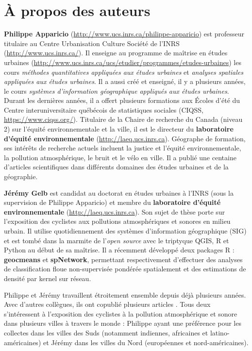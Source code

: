 \documentclass[
  11pt,
  french,
]{book}
\begin{document}
\hypertarget{auteurs}{%
\chapter*{À propos des auteurs}\label{auteurs}}

\textbf{Philippe Apparicio} (\url{http://www.ucs.inrs.ca/philippe-apparicio}) est professeur titulaire au Centre Urbanisation Culture Société de l'INRS (\url{http://www.ucs.inrs.ca/}). Il enseigne au programme de maîtrise en études urbaines (\url{http://www.ucs.inrs.ca/ucs/etudier/programmes/etudes-urbaines}) les cours \emph{méthodes quantitatives appliquées aux études urbaines} et \emph{analyses spatiales appliquées aux études urbaines}. Il a aussi créé et enseigné, il y a plusieurs années, le cours \emph{systèmes d'information géographique appliqués aux études urbaines}. Durant les dernières années, il a offert plusieurs formations aux Écoles d'été du Centre interuniversitaire québécois de statistiques sociales (CIQSS, \url{https://www.ciqss.org/}). Titulaire de la Chaire de recherche du Canada (niveau 2) sur l'équité environnementale et la ville, il est le directeur du \textbf{laboratoire d'équité environnementale} (\url{http://laeq.ucs.inrs.ca}). Géographe de formation, ses intérêts de recherche actuels incluent la justice et l'équité environnementale, la pollution atmosphérique, le bruit et le vélo en ville. Il a publié une centaine d'articles scientifiques dans différents domaines des études urbaines et de la géographie.

\textbf{Jérémy Gelb} est candidat au doctorat en études urbaines à l'INRS (sous la supervision de Philippe Apparicio) et membre du \textbf{laboratoire d'équité environnementale} (\url{http://laeq.ucs.inrs.ca}). Son sujet de thèse porte sur l'exposition des cyclistes aux pollutions atmosphériques et sonores en milieu urbain. Il utilise quotidiennement des systèmes d'information géographique (SIG) et est tombé dans la marmite de l'\emph{open source} avec le triptyque QGIS, R et Python au début de sa maîtrise. Il a récemment développé deux packages R : \textbf{geocmeans} et \textbf{spNetwork}, permettant respectivement d'effectuer des analyses de classification floue non-supervisée pondérée spatialement et des estimations de densité par kernel sur réseau.

Philippe et Jérémy travaillent étroitement ensemble depuis déjà plusieurs années. Avec d'autres collègues, ils ont copublié plusieurs articles \citetext{\citealp{2021_1}; \citealp{2021_2}; \citealp{2021_3}; \citealp[;][]{2021_4}; \citealp{2020_1}; \citealp{2020_2}; \citealp{2020_3}; \citealp{2019_1}; \citealp{2019_2}; \citealp{2019_3}; \citealp{2020_1}; \citealp{2020_2}; \citealp{2018_1}; \citealp{2017_1}; \citealp{2016_1}}. Tous deux s'intéressent à l'exposition des cyclistes à la pollution atmosphérique et sonore dans plusieurs villes à travers le monde : Philippe ayant une préférence pour les collectes dans les villes des Suds (notamment indiennes, africaines et latino-américaines) et Jérémy dans les villes du Nord (européennes et nord-américaines).
\end{document}
